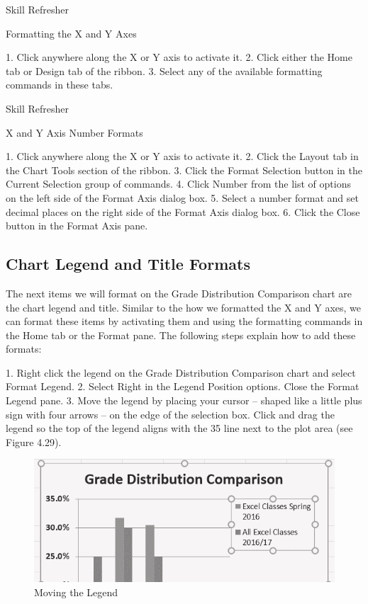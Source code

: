 Skill Refresher


Formatting the X and Y Axes

1. Click anywhere along the X or Y axis to activate it.
2. Click either the Home tab or Design tab of the ribbon.
3. Select any of the available formatting commands in these tabs.




Skill Refresher


X and Y Axis Number Formats

1. Click anywhere along the X or Y axis to activate it.
2. Click the Layout tab in the Chart Tools section of the ribbon.
3. Click the Format Selection button in the Current Selection group of commands.
4. Click Number from the list of options on the left side of the Format Axis dialog box.
5. Select a number format and set decimal places on the right side of the Format Axis dialog box.
6. Click the Close button in the Format Axis pane.



\subsection{Chart Legend and Title Formats}

The next items we will format on the Grade Distribution Comparison chart are the chart legend and
title. Similar to the how we formatted the X and Y axes, we can format these items by activating them
and using the formatting commands in the Home tab or the Format pane. The following steps explain
how to add these formats:

1. Right click the legend on the Grade Distribution Comparison chart and select Format Legend.
2. Select Right in the Legend Position options. Close the Format Legend pane.
3. Move the legend by placing your cursor – shaped like a little plus sign with four arrows – on the
edge of the selection box. Click and drag the legend so the top of the legend aligns with the 35%
line next to the plot area (see Figure 4.29).



\begin{figure}[H]
	\centering
	\includegraphics[width=\maxwidth{.95\linewidth}]{gfx/ch04_fig32}
	\caption{Moving the Legend}
	\label{04:fig32}
\end{figure}





